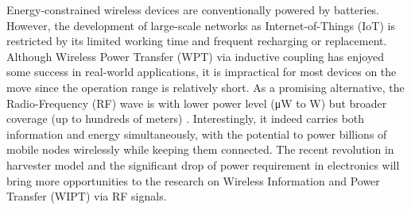 Energy-constrained wireless devices are conventionally powered by batteries. However, the development of large-scale networks as Internet-of-Things (IoT) is restricted by its limited working time and frequent recharging or replacement. Although Wireless Power Transfer (WPT) via inductive coupling has enjoyed some success in real-world applications, it is impractical for most devices on the move since the operation range is relatively short. As a promising alternative, the Radio-Frequency (RF) wave is with lower power level (\si{\uW} to \si{W}) but broader coverage (up to hundreds of meters) \cite{Ng2019}. Interestingly, it indeed carries both information and energy simultaneously, with the potential to power billions of mobile nodes wirelessly while keeping them connected. The recent revolution in harvester model and the significant drop of power requirement in electronics will bring more opportunities to the research on Wireless Information and Power Transfer (WIPT) via RF signals.
